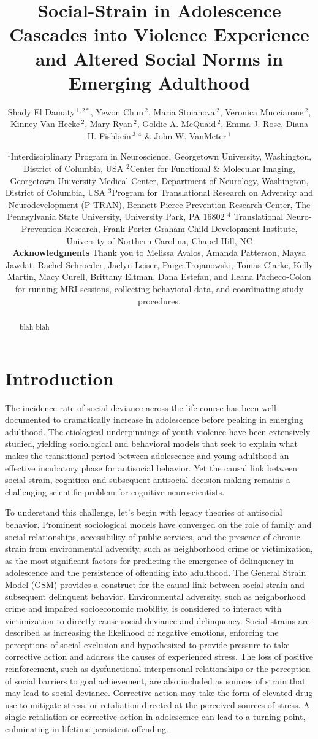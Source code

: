 \documentclass[utf8]{article}
\title{Social-Strain in Adolescence Cascades into Violence Experience and Altered Social Norms in Emerging Adulthood}
\author{
\parbox{\linewidth}{\centering
Shady El Damaty\,$^{1,2*}$, Yewon Chun\,$^{2}$, Maria Stoianova\,$^{2}$, Veronica Mucciarone\,$^{2}$,  Kinney Van Hecke\,$^{2}$, Mary Ryan\,$^{2}$, Goldie A. McQuaid\,$^{2}$, Emma J. Rose, Diana H. Fishbein\,$^{3,4}$ \& John W. VanMeter\,$^{1}$}
}
\date{\footnotesize{$^{1}$Interdisciplinary Program in Neuroscience, Georgetown University, Washington, District of Columbia, USA
$^{2}$Center for Functional \& Molecular Imaging, Georgetown University Medical Center, Department of Neurology, Washington, District of Columbia, USA
$^{3}$Program for Translational Research on Adversity and Neurodevelopment (P-TRAN), Bennett-Pierce Prevention Research Center, The Pennsylvania State University, University Park, PA 16802
$^{4}$ Translational Neuro-Prevention Research, Frank Porter Graham Child Development Institute, University of Northern Carolina, Chapel Hill, NC} \\  \vspace{5pt} \textbf{Acknowledgments}
Thank you to Melissa Avalos, Amanda Patterson, Maysa Jawdat, Rachel Schroeder, Jaclyn Leiser, Paige Trojanowski, Tomas Clarke, Kelly Martin, Macy Curell, Brittany Eltman, Dana Estefan, and Ileana Pacheco-Colon for running MRI sessions, collecting behavioral data, and coordinating study procedures. }
\begin{document}
\maketitle
\begin{abstract}
blah blah
\end{abstract}
\section*{Introduction}
The incidence rate of social deviance across the life course has been well-documented to dramatically increase in adolescence before peaking in emerging adulthood. The etiological underpinnings of youth violence have been extensively studied, yielding sociological and behavioral models that seek to explain what makes the transitional period between adolescence and young adulthood an effective incubatory phase for antisocial behavior. Yet the causal link between social strain, cognition and subsequent antisocial decision making remains a challenging scientific problem for cognitive neuroscientists.

To understand this challenge, let's begin with legacy theories of antisocial behavior. Prominent sociological models have converged on the role of family and social relationships, accessibility of public services, and the presence of chronic strain from environmental adversity, such as neighborhood crime or victimization, as the most significant factors for predicting the emergence of delinquency in adolescence and the persistence of offending into adulthood. The General Strain Model (GSM) provides a construct for the causal link between social strain and subsequent delinquent behavior. Environmental adversity, such as neighborhood crime and impaired socioeconomic mobility, is considered to interact with victimization to directly cause social deviance and delinquency. Social strains are described as increasing the likelihood of negative emotions, enforcing the perceptions of social exclusion and hypothesized to provide pressure to take corrective action and address the causes of experienced stress. The loss of positive reinforcement, such as dysfunctional interpersonal relationships or the perception of social barriers to goal achievement, are also included as sources of strain that may lead to social deviance. Corrective action may take the form of elevated drug use to mitigate stress, or retaliation directed at the perceived sources of stress. A single retaliation or corrective action in adolescence can lead to a turning point, culminating in lifetime persistent offending. 
\end{document}
